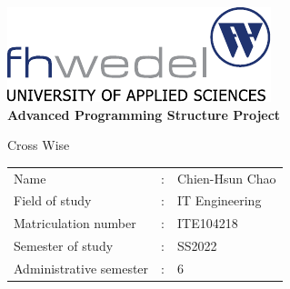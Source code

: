 
\begin{titlepage}
	\begin{center}
		\vspace*{5cm}
		\includegraphics[width=.5\textwidth]{image/fhw}\\
		\bigskip
		\textbf{\LARGE Advanced Programming Structure Project}
		
		\vspace{0.5cm}
		\Large Cross Wise
		
		\vspace{8cm}
		\begin{tabular}{l@{}ll}
			Name & : & Chien-Hsun Chao\\
		    Field of study & : &  IT Engineering\\
			Matriculation number & : & ITE104218\\
		    Semester of study & : & SS2022\\
	    	Administrative semester & : & 6\\
		\end{tabular}
	
		\vspace{5cm}
	\end{center}
	
	
\end{titlepage}